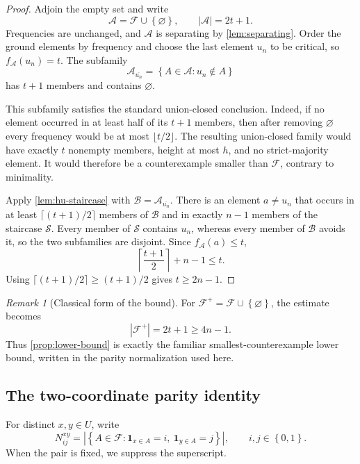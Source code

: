 \documentclass[11pt,reqno]{amsart}
\numberwithin{equation}{section}
\theoremstyle{definition}
\theoremstyle{remark}
\newtheorem{remark}[remark]{Remark}
\newcommand{\F}{\mathcal{F}}
\newcommand{\A}{\mathcal{A}}
\newcommand{\1}{\mathbf{1}}
\newcommand{\set}[1]{\left\{#1\right\}}
\newcommand{\abs}[1]{\left|#1\right|}
\begin{document}
\begin{proof}
Adjoin the empty set and write
\[
\A=\F\cup\set{\varnothing},
\qquad \abs{\A}=2t+1.
\]
Frequencies are unchanged, and \(\A\) is separating by \cref{lem:separating}.  Order the ground elements by frequency and choose the last element \(u_n\) to be critical, so \(f_{\A}(u_n)=t\).  The subfamily
\[
\A_{\overline{u_n}}=\set{A\in\A:u_n\notin A}
\]
has \(t+1\) members and contains \(\varnothing\).

This subfamily satisfies the standard union-closed conclusion.  Indeed, if no element occurred in at least half of its \(t+1\) members, then after removing \(\varnothing\) every frequency would be at most \(\lfloor t/2\rfloor\).  The resulting union-closed family would have exactly \(t\) nonempty members, height at most \(h\), and no strict-majority element.  It would therefore be a counterexample smaller than \(\F\), contrary to minimality.

Apply \cref{lem:hu-staircase} with \(\mathcal B=\A_{\overline{u_n}}\).  There is an element \(a\ne u_n\) that occurs in at least
\(
\lceil (t+1)/2\rceil
\)
members of \(\mathcal B\) and in exactly \(n-1\) members of the staircase \(\mathcal S\).  Every member of \(\mathcal S\) contains \(u_n\), whereas every member of \(\mathcal B\) avoids it, so the two subfamilies are disjoint.  Since \(f_{\A}(a)\le t\),
\[
\left\lceil\frac{t+1}{2}\right\rceil+n-1\le t.
\]
Using \(\lceil (t+1)/2\rceil\ge(t+1)/2\) gives \(t\ge2n-1\).
\end{proof}

\begin{remark}[Classical form of the bound]\label{rem:classical-bound}
For \(\F^+=\F\cup\set{\varnothing}\), the estimate becomes
\[
\abs{\F^+}=2t+1\ge4n-1.
\]
Thus \cref{prop:lower-bound} is exactly the familiar smallest-counterexample lower bound, written in the parity normalization used here.
\end{remark}

\subsection{The two-coordinate parity identity}

For distinct \(x,y\in U\), write
\begin{equation}\label{eq:Nij}
N_{ij}^{xy}
=
\abs{\set{A\in\F:
\1_{x\in A}=i,\ \1_{y\in A}=j}},
\qquad i,j\in\set{0,1}.
\end{equation}
When the pair is fixed, we suppress the superscript.
\end{document}
